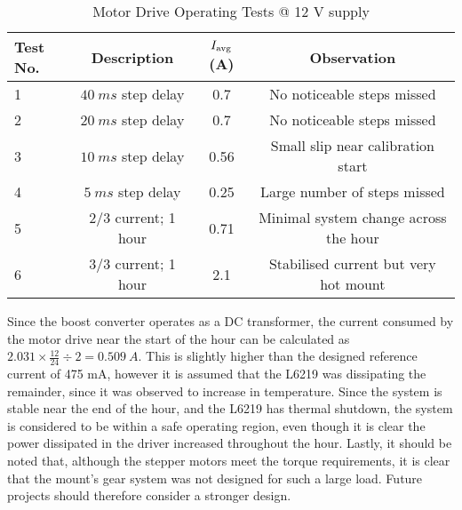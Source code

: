 \begin{table}[!htb]
  \centering
  \renewcommand{\arraystretch}{1.2}
  \begin{tabular}{ |p{0.8cm}|c|c|c| }
  \hline
  \textbf{Test No.}  & \textbf{Description} & \textbf{$I_{\textnormal{avg}}$ (A)} & Observation \\
  \hline
  1
  & $\SI{40}{ms}$ step delay           
  & 0.7
  & No noticeable steps missed
  \\  \hline
  2
  & $\SI{20}{ms}$ step delay           
  & 0.7
  & No noticeable steps missed
  \\  \hline
  3
  & $\SI{10}{ms}$ step delay           
  & 0.56
  & Small slip near calibration start
  \\  \hline
  4
  & $\SI{5}{ms}$ step delay           
  & 0.25
  & Large number of steps missed
  \\  \hline
  5
  & 2/3 current; 1 hour
  & 0.71
  & Minimal system change across the hour
  \\  \hline
  6
  & 3/3 current; 1 hour
  & 2.1
  & Stabilised current but very hot mount
  \\  \hline
  \end{tabular}
  \caption{Motor Drive Operating Tests @ 12 V supply}
  \label{tab:motorDriveTests}
\end{table}

Since the boost converter operates as a DC transformer, the current consumed by the motor drive near the start of the hour can be calculated as $2.031 \times \frac{12}{24} \div 2 = \SI{0.509}{A}$. This is slightly higher than the designed reference current of 475 mA, however it is assumed that the L6219 was dissipating the remainder, since it was observed to increase in temperature. Since the system is stable near the end of the hour, and the L6219 has thermal shutdown, the system is considered to be within a safe operating region, even though it is clear the power dissipated in the driver increased throughout the hour. Lastly, it should be noted that, although the stepper motors meet the torque requirements, it is clear that the mount's gear system was not designed for such a large load. Future projects should therefore consider a stronger design.
